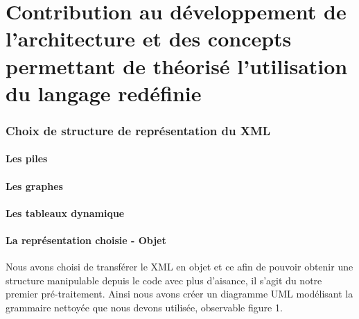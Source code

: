 \documentclass{article}
\begin{document}












\iffalse
\pagebreak
\part{Contribution au développement de l'architecture et des concepts permettant de théorisé l'utilisation du langage redéfinie}
\section{Choix de structure de représentation du XML}
\subsection{Les piles}
\subsection{Les graphes}
\subsection{Les tableaux dynamique}

\subsection{La représentation choisie - Objet}
Nous avons choisi de transférer le XML en objet et ce afin de pouvoir obtenir une structure manipulable depuis le code avec plus d'aisance, il s'agit du notre premier pré-traitement. Ainsi nous avons créer un diagramme UML modélisant la grammaire nettoyée que nous devons utilisée, observable figure 1.
\end{document}
